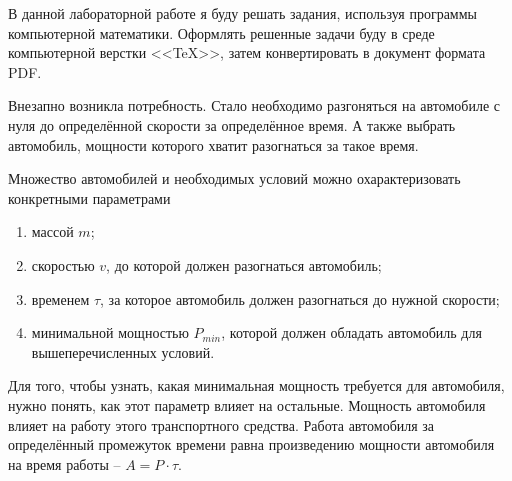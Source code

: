 \documentclass[a4paper, 14pt, titlepage, fleqn]{extarticle}
\begin{document}
	\tableofcontents
	\newpage

    \onehalfspacing
    

        В данной лабораторной работе я буду решать задания, используя программы компьютерной математики. Оформлять решенные задачи буду в среде компьютерной верстки <<\TeX>>, затем конвертировать в документ формата PDF.
        

            Внезапно возникла потребность. Стало необходимо разгоняться на автомобиле с нуля до определённой скорости за определённое время. А также выбрать автомобиль, мощности которого хватит разогнаться за такое время. 
        
            Множество автомобилей и необходимых условий можно охарактеризовать конкретными параметрами
            
            \begin{enumerate}
                \item массой $m$;
                \item скоростью $v$, до которой должен разогнаться автомобиль;
                \item временем $\tau$, за которое автомобиль должен разогнаться до нужной скорости;
                \item минимальной мощностью $P_{min}$, которой должен обладать автомобиль для вышеперечисленных условий.
            \end{enumerate}

            Для того, чтобы узнать, какая минимальная мощность требуется для автомобиля, нужно понять, как этот параметр влияет на остальные.
            Мощность автомобиля влияет на работу этого транспортного средства.
            Работа автомобиля за определённый промежуток времени равна произведению мощности автомобиля на время работы -- \(A = P \cdot \tau\). 
            
\end{document}
